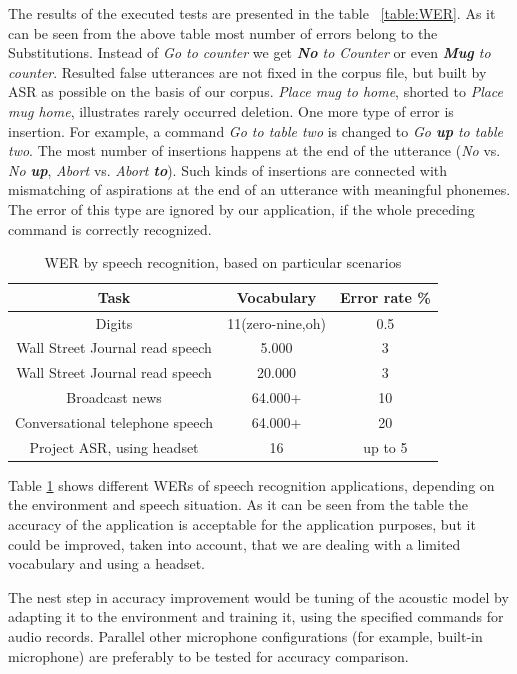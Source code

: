 \documentclass[11pt,a4paper]{report}
\begin{document}
 
The results of the executed tests are presented in the table ~\ref{table:WER}.
As it can be seen from the above table most number of errors belong to the 
Substitutions. Instead of \textit {Go to counter} we get \textit {\textbf{No} to
Counter} or even \textit{\textbf {Mug} to counter}.  Resulted false utterances
are not fixed in the corpus file, but built by ASR as possible on the basis of
our corpus. \textit {Place mug to home},
shorted to \textit{Place mug home}, illustrates rarely occurred deletion.  One
more type of error is insertion. For example, a command
\textit {Go to table two} is changed to \textit {Go \textbf {up} to table two}. The most number of insertions happens at the end of the utterance (\textit {No}
vs. \textit {No \textbf {up}}, \textit {Abort} vs. \textit {Abort \textbf
{to}}). Such kinds of insertions are connected with mismatching of aspirations
at the end of an utterance with meaningful phonemes. The error of this type
are ignored by our application, if the whole preceding command is correctly
recognized. 

\begin {table}[h]
\begin{center}
\begin{tabular}[h]{| c || c || c|} \hline
Task & Vocabulary & Error rate \% \\ \hline
Digits & 11(zero-nine,oh)&0.5 \\
Wall Street Journal read speech & 5.000 &3 \\
Wall Street Journal read speech & 20.000 &3 \\
Broadcast news & 64.000+ &10 \\
Conversational telephone speech & 64.000+ &20 \\
Project ASR, using headset & 16 & up to 5\\
\hline
\end{tabular}
\caption {WER by speech recognition, based on particular scenarios}
\label {table:WERS}
\end {center}
\end {table}

Table \ref{table:WERS} shows different WERs of speech
recognition applications, depending on the environment and speech situation. As
it can be seen from the table the accuracy of the application is acceptable for
the application purposes, but it could be improved, taken into account, that we
are dealing with a limited vocabulary and using a headset.  

The nest step in accuracy improvement
would be tuning of the acoustic model by adapting it to the environment and training it,
using the  specified commands for audio records. Parallel other microphone
configurations (for example, built-in microphone) are preferably to be tested
for accuracy comparison.
\end{document}
